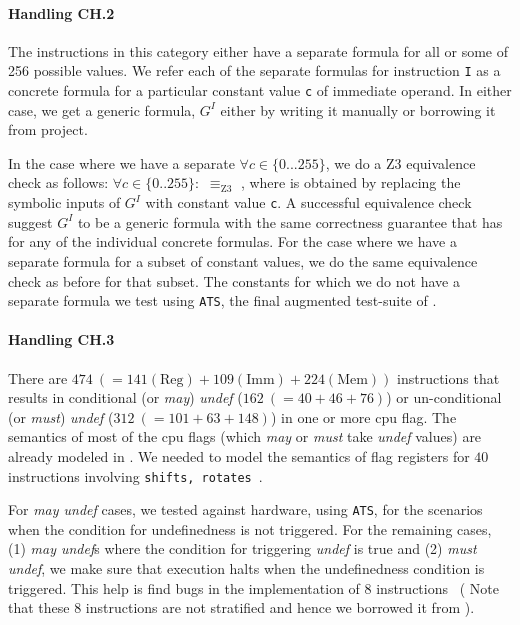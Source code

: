    
   
   
   
   \paragraph{Handling CH.2} The instructions in this category either  have a
   separate formula for all or some of 256 possible values. We refer each of the
   separate formulas for instruction {\tt I} as a concrete formula  for
   a particular constant value {\tt c} of immediate operand.  In either case, we
   get a generic formula, $G^I$ either by writing it manually or borrowing it
   from  \Stoke project.
   
   In the case where we have a separate  $\forall c \in \{0...255\}$,
   we do a Z3 equivalence check as follows: $\forall c \in \{0..255\}:$
    $\equiv_\text{Z3}$ , where  is obtained by
   replacing the symbolic inputs of $G^I$ with constant value {\tt c}. A
   successful equivalence check suggest $G^I$ to be a generic formula with the
   same correctness guarantee that \Strata has for any of the individual
   concrete formulas. For the case where we have a separate formula for a subset
   of constant values, we do the same equivalence check as before for that
   subset. The constants for which we do not have a separate formula we test
    using {\tt ATS}, the final augmented test-suite of \Strata. 
    
    \paragraph{Handling CH.3} There are $474\ (= 141(\text{Reg}) +
        109(\text{Imm}) + 224(\text{Mem}))$ instructions that results in
    conditional  (or \emph{may}) \emph{undef} ($162\ (= 40 + 46 + 76)$) or
    un-conditional (or \emph{must}) \emph{undef} ($312\ (= 101 + 63 + 148)$)  in
    one or more cpu flag.  The semantics of most of the cpu flags (which
        \emph{may} or \emph{must} take \emph{undef} values) are already modeled
    in \Stoke. We needed to model the semantics of flag registers for $40$
    instructions involving {\tt shifts, rotates}~\cite{BugStoke986}. 
    
    For \emph{may undef} cases, we tested against hardware, using {\tt ATS}, for
    the scenarios when the condition for undefinedness is not triggered.  For
    the remaining cases, (1) \emph{may undef}s where the condition for
    triggering \emph{undef} is true and (2) \emph{must undef}, we make sure that
    \K execution halts when the undefinedness condition is triggered. This help
    is find bugs in the \Stoke implementation of $8$
    instructions~\cite{BugStoke986} ( Note that these $8$ instructions are not
        stratified and hence we borrowed it from \Stoke).   
    
